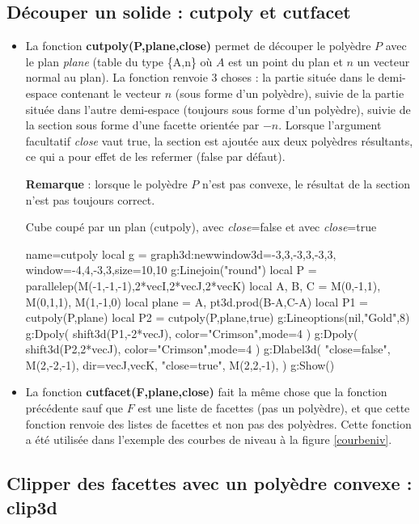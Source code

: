\subsection{Découper un solide : cutpoly et cutfacet}

\begin{itemize}
    \item La fonction \textbf{cutpoly(P,plane,close)} permet de découper le polyèdre $P$ avec le plan \emph{plane} (table du type \{A,n\} où $A$ est un point du plan et $n$ un vecteur normal au plan). La fonction renvoie 3 choses : la partie située dans le demi-espace contenant le vecteur $n$ (sous forme d'un polyèdre), suivie de la partie située dans l'autre demi-espace (toujours sous forme d'un polyèdre), suivie de la section sous forme d'une facette orientée par $-n$. Lorsque l'argument facultatif \emph{close} vaut true, la section est ajoutée aux deux polyèdres résultants, ce qui a pour effet de les refermer (false par défaut).\par
    \textbf{Remarque} : lorsque le polyèdre $P$ n'est pas convexe, le résultat de la section n'est pas toujours correct.

\begin{demo}{Cube coupé par un plan (cutpoly), avec \emph{close}=false et avec \emph{close}=true}
\begin{luadraw}{name=cutpoly}
local g = graph3d:new{window3d={-3,3,-3,3,-3,3}, window={-4,4,-3,3},size={10,10}}
g:Linejoin("round")
local P = parallelep(M(-1,-1,-1),2*vecI,2*vecJ,2*vecK)
local A, B, C = M(0,-1,1), M(0,1,1), M(1,-1,0)
local plane = {A, pt3d.prod(B-A,C-A)}
local P1 = cutpoly(P,plane)
local P2 = cutpoly(P,plane,true)
g:Lineoptions(nil,"Gold",8)
g:Dpoly( shift3d(P1,-2*vecJ), {color="Crimson",mode=4} )
g:Dpoly( shift3d(P2,2*vecJ), {color="Crimson",mode=4} )
g:Dlabel3d(
    "close=false", M(2,-2,-1), {dir={vecJ,vecK}},
    "close=true", M(2,2,-1), {}
    )
g:Show()            
\end{luadraw}
\end{demo}

     \item La fonction \textbf{cutfacet(F,plane,close)} fait la même chose que la fonction précédente sauf que $F$ est une liste de facettes (pas un polyèdre), et que cette fonction renvoie des listes de facettes et non pas des polyèdres. Cette fonction a été  utilisée dans l'exemple des courbes de niveau à la figure \ref{courbeniv}.
\end{itemize}

\subsection{Clipper des facettes avec un polyèdre convexe : clip3d}

